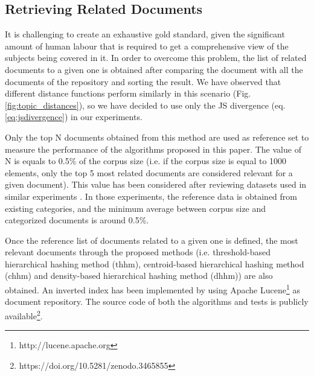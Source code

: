 \subsection{Retrieving Related Documents}
\label{sec:comparison-search}

It is challenging to create an exhaustive gold standard, given the significant amount of human labour that is required to get a comprehensive view of the subjects being covered in it. In order to overcome this problem, the list of related documents to a given one is obtained after comparing the document with all the documents of the repository and sorting the result. We have observed that different distance functions perform similarly in this scenario (Fig. \ref{fig:topic_distances}), so we have decided to use only the JS divergence (eq. \ref{eq:jsdivergence}) in our experiments.

Only the top N documents obtained from this method are used as reference set to measure the performance of the algorithms proposed in this paper. The value of N is equals to 0.5\% of the corpus size (i.e. if the corpus size is equal to 1000 elements, only the top 5 most related documents are considered relevant for a given document). This value has been considered after reviewing datasets used in similar experiments \citep{Krstovski2013a, Mao2017}. In those experiments, the reference data is obtained from existing categories, and the minimum average between corpus size and categorized documents is around 0.5\%. 

Once the reference list of documents related to a given one is defined, the most relevant documents through the proposed methods (i.e. threshold-based hierarchical hashing method (thhm), centroid-based hierarchical hashing method (chhm) and density-based hierarchical hashing method (dhhm)) are also obtained. An inverted index has been implemented by using Apache Lucene\footnote{http://lucene.apache.org} as document repository. The source code of both the algorithms and tests is publicly available\footnote{https://doi.org/10.5281/zenodo.3465855}. 

